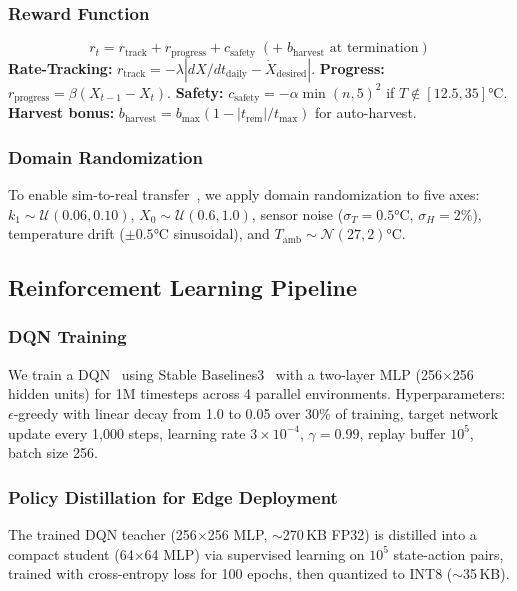 \documentclass[conference]{IEEEtran}
\begin{document}
\subsubsection{Reward Function}
\label{sec:reward}
\begin{equation}
r_t = r_{\text{track}} + r_{\text{progress}} + c_{\text{safety}} \;(+ \; b_{\text{harvest}} \text{ at termination})
\label{eq:reward}
\end{equation}
\noindent \textbf{Rate-Tracking:} $r_{\text{track}} = -\lambda |dX/dt_{\text{daily}} - \dot{X}_{\text{desired}}|$. \textbf{Progress:} $r_{\text{progress}} = \beta(X_{t-1} - X_t)$. \textbf{Safety:} $c_{\text{safety}} = -\alpha \min(n,5)^2$ if $T \notin [12.5, 35]$°C. \textbf{Harvest bonus:} $b_{\text{harvest}} = b_{\max}(1 - |t_{\text{rem}}|/t_{\max})$ for auto-harvest.

\subsubsection{Domain Randomization}
To enable sim-to-real transfer~\cite{tobin2017sim2real}, we apply domain randomization to five axes: $k_1 \sim \mathcal{U}(0.06, 0.10)$, $X_0 \sim \mathcal{U}(0.6, 1.0)$, sensor noise ($\sigma_T = 0.5$°C, $\sigma_H = 2\%$), temperature drift ($\pm 0.5$°C sinusoidal), and $T_{\text{amb}} \sim \mathcal{N}(27, 2)$°C.

\subsection{Reinforcement Learning Pipeline}

\subsubsection{DQN Training}
We train a DQN~\cite{mnih2015dqn} using Stable Baselines3~\cite{raffin2021sb3} with a two-layer MLP (256$\times$256 hidden units) for 1M timesteps across 4 parallel environments. Hyperparameters: $\epsilon$-greedy with linear decay from 1.0 to 0.05 over 30\% of training, target network update every 1,000 steps, learning rate $3 \times 10^{-4}$, $\gamma = 0.99$, replay buffer $10^5$, batch size 256.

\subsubsection{Policy Distillation for Edge Deployment}
The trained DQN teacher (256$\times$256 MLP, $\sim$270\,KB FP32) is distilled into a compact student (64$\times$64 MLP) via supervised learning on $10^5$ state-action pairs, trained with cross-entropy loss for 100 epochs, then quantized to INT8 ($\sim$35\,KB).
\end{document}
